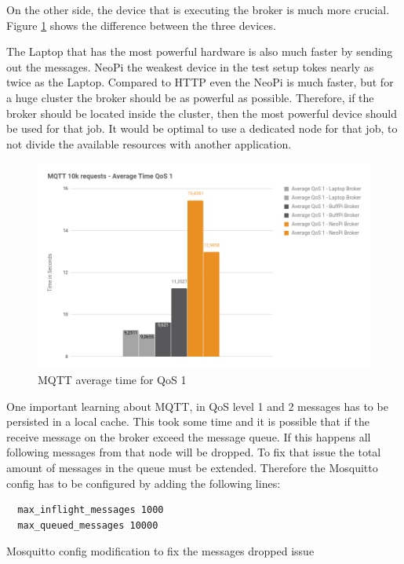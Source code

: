 On the other side, the device that is executing the broker is much more crucial.
Figure \ref{fig:performance_mqtt_average_time_qos_1} shows the difference between the three devices.\newline

The Laptop that has the most powerful hardware is also much faster by sending out the messages.
NeoPi the weakest device in the test setup tokes nearly as twice as the Laptop.
Compared to \ac{HTTP} even the NeoPi is much faster, but for a huge cluster the broker should be as powerful as possible.
Therefore, if the broker should be located inside the cluster, then the most powerful device should be used for that job.
It would be optimal to use a dedicated node for that job, to not divide the available resources with another application.

\begin{figure}[H]
    \centering
    \includegraphics[width=\textwidth]{resources/images/performance_mqtt_average_time_qos_1.png}
    \caption[MQTT average time for QoS 1]{MQTT average time for QoS 1}
    \label{fig:performance_mqtt_average_time_qos_1}
\end{figure}

One important learning about MQTT, in \ac{QoS} level 1 and 2 messages has to be persisted in a local cache.
This took some time and it is possible that if the receive message on the broker exceed the message queue.
If this happens all following messages from that node will be dropped.
To fix that issue the total amount of messages in the queue must be extended.
Therefore the Mosquitto config has to be configured by adding the following lines:

\begin{listing}[H]
  \begin{verbatim}
  max_inflight_messages 1000
  max_queued_messages 10000
  \end{verbatim}
  \caption[Mosquitto config modification to fix the messages dropped issue]{Mosquitto config modification to fix the messages dropped issue}
  \label{code:performance_mosquitto_config}
\end{listing}


